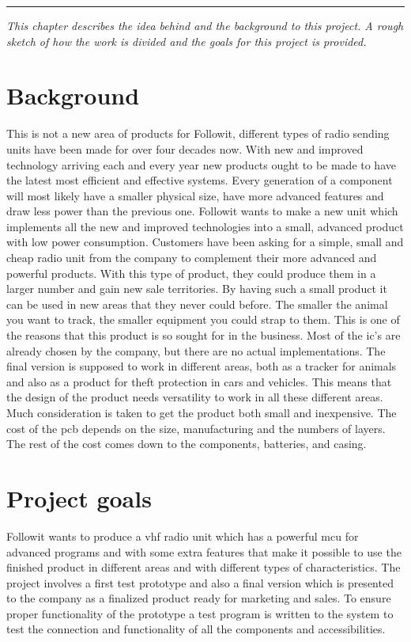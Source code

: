 
\vspace{-10ex}%
\rule{\textwidth}{0.3pt}
\vspace{5ex}

\textit{ 
This chapter describes the idea behind and the background to this project. A rough sketch of how the work is divided and the goals for this project is provided.
}
\vspace{5ex}

\section{Background}
This is not a new area of products for Followit, different types of radio sending units have been made for over four decades now. 
With new and improved technology arriving each and every year new products ought to be made to have the latest most efficient and effective systems. Every generation of a component will most likely have a smaller physical size, have more advanced features and draw less power than the previous one. Followit wants to make a new unit which implements all the new and improved technologies into a small, advanced product with low power consumption. 
Customers have been asking for a simple, small and cheap radio unit from the company to complement their more advanced and powerful products. With this type of product, they could produce them in a larger number and gain new sale territories. By having such a small product it can be used in new areas that they never could before. The smaller the animal you want to track, the smaller equipment you could strap to them. This is one of the reasons that this product is so sought for in the business. 
\newline 
Most of the \gls{ic}'s are already chosen by the company, but there are no actual implementations. The final version is supposed to work in different areas, both as a tracker for animals and also as a product for theft protection in cars and vehicles. This means that the design of the product needs versatility to work in all these different areas.  
Much consideration is taken to get the product both small and inexpensive. The cost of the \gls{pcb} depends on the size, manufacturing and the numbers of layers. The rest of the cost comes down to the components, batteries, and casing.    \\

\section{Project goals}
Followit wants to produce a \gls{vhf} radio unit which has a powerful \gls{mcu} for advanced programs and with some extra features that make it possible to use the finished product in different areas and with different types of characteristics. The project involves a first test prototype and also a final version which is presented to the company as a finalized product ready for marketing and sales. To ensure proper functionality of the prototype a test program is written to the system to test the connection and functionality of all the components and accessibilities. 

